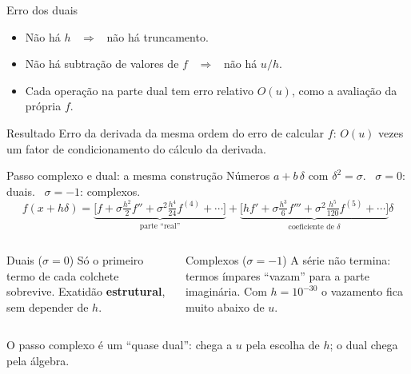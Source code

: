 \documentclass[aspectratio=169,11pt]{beamer}
\begin{document}
\begin{frame}{Erro dos duais}
  \begin{itemize}
    \item Não há $h$ \ $\Rightarrow$ \ não há truncamento.
    \item Não há subtração de valores de $f$ \ $\Rightarrow$ \ não há $u/h$.
    \item Cada operação na parte dual tem erro relativo $O(u)$, como a avaliação da própria $f$.
  \end{itemize}
  \vspace{0.6em}
  \begin{exampleblock}{Resultado}
    Erro da derivada da mesma ordem do erro de calcular $f$: $O(u)$ vezes um fator de condicionamento do cálculo da derivada.
  \end{exampleblock}
  \vspace{0.6em}
  \centering
\end{frame}

\begin{frame}{Passo complexo e dual: a mesma construção}
  Números $a+b\,\delta$ com $\delta^2=\sigma$. \ $\sigma=0$: duais. \ $\sigma=-1$: complexos.
  \[
    f(x+h\delta) = \underbrace{\Big[f + \sigma\tfrac{h^2}{2}f'' + \sigma^2\tfrac{h^4}{24}f^{(4)}+\cdots\Big]}_{\text{parte ``real''}}
    + \underbrace{\Big[h f' + \sigma\tfrac{h^3}{6}f''' + \sigma^2\tfrac{h^5}{120}f^{(5)}+\cdots\Big]}_{\text{coeficiente de }\delta}\delta
  \]
  \begin{columns}[T]
    \begin{exampleblock}{Duais ($\sigma=0$)}
      Só o primeiro termo de cada colchete sobrevive. Exatidão \textbf{estrutural}, sem depender de $h$.
    \end{exampleblock}
    \begin{block}{Complexos ($\sigma=-1$)}
      A série não termina: termos ímpares ``vazam'' para a parte imaginária. Com $h=10^{-30}$ o vazamento fica muito abaixo de $u$.
    \end{block}
  \end{columns}
  \vspace{0.5em}
  \centering
  \alert{O passo complexo é um ``quase dual''}: chega a $u$ pela escolha de $h$; o dual chega pela álgebra.
\end{frame}
\end{document}
